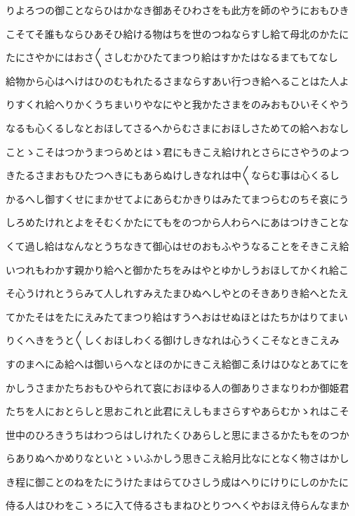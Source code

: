 \documentclass[a4paper,11pt,landscape]{ltjtarticle}
\begin{document}
りよろつの御ことならひはかなき御あそひわさをも此方を師のやうにおもひき
\par\medskip
こそてそ誰もならひあそひ給ける物はちを世のつねならすし給て母北のかたに
\par\medskip
たにさやかにはおさ〱さしむかひたてまつり給はすかたはなるまてもてなし
\par\medskip
給物から心はへけはひのむもれたるさまならすあい行つき給へることはた人よ
\par\medskip
りすくれ給へりかくうちまいりやなにやと我かたさまをのみおもひいそくやう
\par\medskip
なるも心くるしなとおほしてさるへからむさまにおほしさためての給へおなし
\par\medskip
ことゝこそはつかうまつらめとはゝ君にもきこえ給けれとさらにさやうのよつ
\par\medskip
きたるさまおもひたつへきにもあらぬけしきなれは中〱ならむ事は心くるし
\par\medskip
かるへし御すくせにまかせてよにあらむかきりはみたてまつらむのちそ哀にう
\par\medskip
しろめたけれとよをそむくかたにてもをのつから人わらへにあはつけきことな
\par\medskip
くて過し給はなんなとうちなきて御心はせのおもふやうなることをそきこえ給
\par\medskip
いつれもわかす親かり給へと御かたちをみはやとゆかしうおほしてかくれ給こ
\par\medskip
そ心うけれとうらみて人しれすみえたまひぬへしやとのそきありき給へとたえ
\par\medskip
てかたそはをたにえみたてまつり給はすうへおはせぬほとはたちかはりてまい
\par\medskip
りくへきをうと〱しくおほしわくる御けしきなれは心うくこそなときこえみ
\par\medskip
すのまへにゐ給へは御いらへなとほのかにきこえ給御こゑけはひなとあてにを
\par\medskip
かしうさまかたちおもひやられて哀におほゆる人の御ありさまなりわか御姫君
\par\medskip
たちを人におとらしと思おこれと此君にえしもまさらすやあらむかゝれはこそ
\par\medskip
世中のひろきうちはわつらはしけれたくひあらしと思にまさるかたもをのつか
\par\medskip
らありぬへかめりなといとゝいふかしう思きこえ給月比なにとなく物さはかし
\par\medskip
き程に御ことのねをたにうけたまはらてひさしう成はへりにけりにしのかたに
\par\medskip
侍る人はひわをこゝろに入て侍るさもまねひとりつへくやおほえ侍らんなまか
\end{document}
